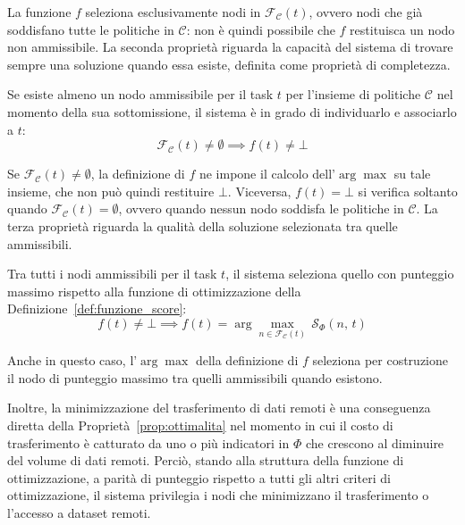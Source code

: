 La funzione $f$ seleziona esclusivamente nodi in $\mathcal{F_C}(t)$, ovvero nodi che già soddisfano tutte le politiche in $\mathcal{C}$: non è quindi possibile che $f$ restituisca un nodo non ammissibile. La seconda proprietà riguarda la capacità del sistema di trovare sempre una soluzione quando essa esiste, definita come proprietà di completezza.

\begin{property}[Completezza] 
    \label{prop:completezza}
    Se esiste almeno un nodo ammissibile per il task $t$ per l'insieme di politiche $\mathcal{C}$ nel momento della sua sottomissione, il sistema è in grado di individuarlo e associarlo a $t$:
    \begin{equation}
        \mathcal{F_C}(t) \neq \emptyset \implies f(t) \neq \bot
    \end{equation}
\end{property}

Se $\mathcal{F_C}(t) \neq \emptyset$, la definizione di $f$ ne impone il calcolo dell'$\arg\max$ su tale insieme, che non può quindi restituire $\bot$. Viceversa, $f(t) = \bot$ si verifica soltanto quando $\mathcal{F_C}(t) = \emptyset$, ovvero quando nessun nodo soddisfa le politiche in $\mathcal{C}$. La terza proprietà riguarda la qualità della soluzione selezionata tra quelle ammissibili.

\begin{property}[Ottimalità] 
    \label{prop:ottimalita}
    Tra tutti i nodi ammissibili per il task $t$, il sistema seleziona quello con punteggio massimo rispetto alla funzione di ottimizzazione della Definizione~\ref{def:funzione_score}:
    \begin{equation}
        f(t) \neq \bot \implies f(t) = \arg\max_{n \in \mathcal{F_C}(t)}\,\mathcal{S}_\Phi(n,\,t)
    \end{equation}
\end{property}

Anche in questo caso, l'$\arg\max$ della definizione di $f$ seleziona per costruzione il nodo di punteggio massimo tra quelli ammissibili quando esistono.

Inoltre, la minimizzazione del trasferimento di dati remoti è una conseguenza diretta della Proprietà~\ref{prop:ottimalita} nel momento in cui il costo di trasferimento è catturato da uno o più indicatori in $\Phi$ che crescono al diminuire del volume di dati remoti. Perciò, stando alla struttura della funzione di ottimizzazione, a parità di punteggio rispetto a tutti gli altri criteri di ottimizzazione, il sistema privilegia i nodi che minimizzano il trasferimento o l'accesso a dataset remoti.